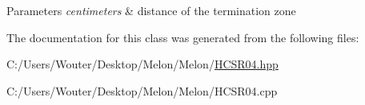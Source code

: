 \begin{DoxyParams}{Parameters}
{\em centimeters} & distance of the termination zone \\
\hline
\end{DoxyParams}


The documentation for this class was generated from the following files\+:\begin{DoxyCompactItemize}
\item 
C\+:/\+Users/\+Wouter/\+Desktop/\+Melon/\+Melon/\hyperlink{_h_c_s_r04_8hpp}{H\+C\+S\+R04.\+hpp}\item 
C\+:/\+Users/\+Wouter/\+Desktop/\+Melon/\+Melon/H\+C\+S\+R04.\+cpp\end{DoxyCompactItemize}
